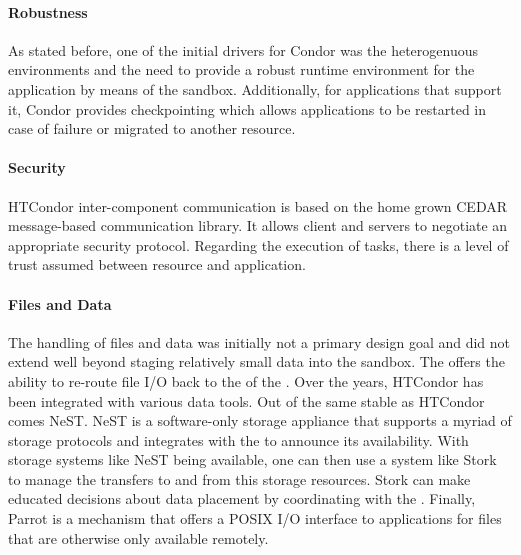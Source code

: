 \documentclass{sig-alternate}
\begin{document}
\paragraph{Robustness}

As stated before, one of the initial drivers for Condor was the heterogenuous
environments and the need to provide a robust runtime environment for the
application by means of the sandbox.
Additionally, for applications that support it, Condor provides checkpointing
which allows applications to be restarted in case of failure or migrated to
another resource.

\paragraph{Security}

HTCondor inter-component communication is based on the home grown CEDAR
message-based communication library. It allows client and servers to negotiate
an appropriate security protocol. Regarding the execution of tasks, there is a
level of trust assumed between resource and application.

\paragraph{Files and Data}

The handling of files and data was initially not a primary design goal and did
not extend well beyond staging relatively small data into the sandbox. The
 offers the ability to re-route file I/O back to the
 of the . Over the years, HTCondor has been
integrated with various data tools. Out of the same stable as HTCondor comes
NeST\cite{}. NeST is a
software-only storage appliance that supports a myriad of storage protocols and
integrates with the  to announce its availability. With
storage systems like NeST being available, one can then use a system like
Stork\cite{} to manage the transfers to and from this storage resources. Stork
can make educated decisions about data placement by coordinating with the
. Finally, Parrot\cite{} is a mechanism that offers a POSIX
I/O interface to applications for files that are otherwise only available
remotely.

\end{document}
